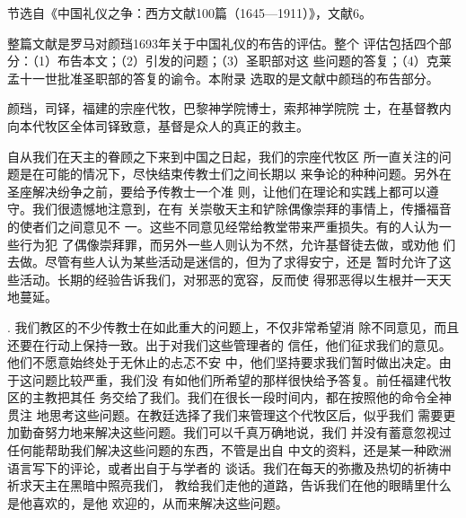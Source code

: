 \par
节选自《中国礼仪之争：西方文献100篇（1645—1911）》，文献6。%
\par
整篇文献是罗马对颜珰1693年关于中国礼仪的布告的评估。整个%
评估包括四个部分：（1）布告本文；（2）引发的问题；（3）圣职部对这%
些问题的答复；（4）克莱孟十一世批准圣职部的答复的谕令。本附录%
选取的是文献中颜珰的布告部分。%
\par
{\bookkai 颜珰，司铎，福建的宗座代牧，巴黎神学院博士，索邦神学院院}%
{\bookkai 士，在基督教内向本代牧区全体司铎致意，基督是众人的真正的救主。}%
\par
{\bookkai 自从我们在天主的眷顾之下来到中国之日起，我们的宗座代牧区}%
{\bookkai 所一直关注的问题是在可能的情况下，尽快结束传教士们之间长期以}%
{\bookkai 来争论的种种问题。另外在圣座解决纷争之前，要给予传教士一个准}%
{\bookkai 则，让他们在理论和实践上都可以遵守。我们很遗憾地注意到，在有}%
{\bookkai 关崇敬天主和铲除偶像崇拜的事情上，传播福音的使者们之间意见不}%
{\bookkai 一。这些不同意见经常给教堂带来严重损失。有的人认为一些行为犯}%
{\bookkai 了偶像崇拜罪，而另外一些人则认为不然，允许基督徒去做，或劝他}%
{\bookkai 们去做。尽管有些人认为某些活动是迷信的，但为了求得安宁，还是}%
{\bookkai 暂时允许了这些活动。长期的经验告诉我们，对邪恶的宽容，反而使}%
{\bookkai 得邪恶得以生根并一天天地蔓延。}%
\par
{. 我们教区的不少传教士在如此重大的问题上，不仅非常希望消}%
{\bookkai 除不同意见，而且还要在行动上保持一致。出于对我们这些管理者的}%
{\bookkai 信任，他们征求我们的意见。他们不愿意始终处于无休止的忐忑不安}%
{\bookkai 中，他们坚持要求我们暂时做出决定。由于这问题比较严重，我们没}%
{\bookkai 有如他们所希望的那样很快给予答复。前任福建代牧区的主教把其任}%
{\bookkai 务交给了我们。我们在很长一段时间内，都在按照他的命令全神贯注}%
{\bookkai 地思考这些问题。在教廷选择了我们来管理这个代牧区后，似乎我们}%
{\bookkai 需要更加勤奋努力地来解决这些问题。我们可以千真万确地说，我们}%
{\bookkai 并没有蓄意忽视过任何能帮助我们解决这些问题的东西，不管是出自}%
{\bookkai 中文的资料，还是某一种欧洲语言写下的评论，或者出自于与学者的}%
{\bookkai 谈话。我们在每天的弥撒及热切的祈祷中祈求天主在黑暗中照亮我们，}%
{\bookkai 教给我们走他的道路，告诉我们在他的眼睛里什么是他喜欢的，是他}%
{\bookkai 欢迎的，从而来解决这些问题。}%
\par
